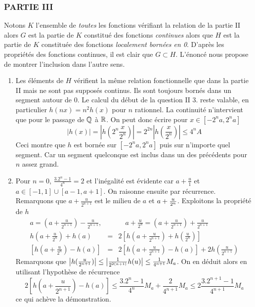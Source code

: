\subsubsection*{PARTIE III}
Notons $K$ l'ensemble de \emph{toutes} les fonctions vérifiant la relation de la partie II alors $G$ est la partie de $K$ constitué des fonctions \emph{continues} alors que $H$ est la partie de $K$ constituée des fonctions \emph{localement bornées en 0}.\newline
D'après les propriétés des fonctions continues, il est clair que $G \subset H$. L'énoncé nous propose de montrer l'inclusion dans l'autre sens.
\begin{enumerate}
\item  Les {\'e}l{\'e}ments de $H$ v{\'e}rifient la m{\^e}me relation
fonctionnelle que dans la partie II mais ne sont pas suppos{\'e}s
continus. Ils sont toujours born{\'e}s dans un segment autour de
$0$.\newline
Le calcul du d{\'e}but de la question II 3. reste valable, en particulier $%
h(nx)=n^{2}h(x)$ pour $n$ rationnel$.$ La continuit{\'e} n'intervient
que pour le passage de $\mathbb{Q}$ {\`a} $\mathbb{R}$. On peut donc {\'e}crire
pour $x\in \left[ -2^{n}a,2^{n}a\right] $%
\[
\left| h(x)\right| =\left| h(2^{n}\frac{x}{2^{n}})\right| =2^{2n}\left| h(%
\frac{x}{2^{n}})\right| \leq 4^{n}A
\]
Ceci montre que $h$ est born{\'e}e sur $\left[ -2^{n}a,2^{n}a\right] $
puis sur n'importe quel segment. Car un segment quelconque est
inclus dans un des pr{\'e}c{\'e}dents pour $n$ assez grand.

\item  Pour $n=0$, $\frac{3.2^{n}-1}{4^{n}}=2$ et l'in{\'e}galit{\'e} est
{\'e}vidente car $a+\frac{u}{1}$ et $a\in \left[ -1,1\right] \cup
\left[ a-1,a+1\right] $. On raisonne ensuite par
r{\'e}currence.\newline
Remarquons que $a+\frac{u}{2^{n+1}}$ est le milieu de $a$ et $a+\frac{u}{%
2^{n}}$. Exploitons la propri{\'e}t{\'e} de $h$%
\begin{eqnarray*}
a=(a+\frac{u}{2^{n+1}})-\frac{u}{2^{n+1}}, &&\quad a+\frac{u}{2^{n}}=(a+%
\frac{u}{2^{n+1}})+\frac{u}{2^{n+1}} \\
h(a+\frac{u}{2^{n}})+h(a) &=&2\left[ h(a+\frac{u}{2^{n+1}})+h(\frac{u}{2^{n}}%
)\right]  \\
\left[ h(a+\frac{u}{2^{n}})-h(a)\right]  &=&2\left[ h(a+\frac{u}{2^{n+1}}%
)-h(a)\right] +2h(\frac{u}{2^{n+1}})
\end{eqnarray*}
Remarquons que $\left| h(\frac{u}{2^{n+1}})\right| \leq \left| \frac{1}{%
2^{2(n+1)}}h(u)\right| \leq \frac{1}{4^{n+1}}M_{a}$. On en d{\'e}duit
alors en utilisant l'hypoth{\`e}se de r{\'e}currence
\[
2\left[ h(a+\frac{u}{2^{n+1}})-h(a)\right] \leq \frac{3.2^{n}-1}{4^{n}}M_{a}+%
\frac{2}{4^{n+1}}M_{a}\leq 2\frac{3.2^{n+1}-1}{4^{n+1}}M_{a}
\]
ce qui ach{\`e}ve la d{\'e}monstration.


\end{enumerate}
